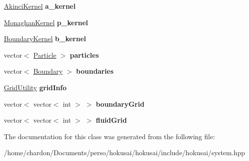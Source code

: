 \begin{DoxyCompactItemize}
\item 
\hypertarget{classhokusai_1_1System_a643e5fd74ea16fb4c94cb1dba484d8d5}{\hyperlink{classhokusai_1_1AkinciKernel}{Akinci\+Kernel} {\bfseries a\+\_\+kernel}}\label{classhokusai_1_1System_a643e5fd74ea16fb4c94cb1dba484d8d5}

\item 
\hypertarget{classhokusai_1_1System_a210262981b4c32489816b3bb4702bb24}{\hyperlink{classhokusai_1_1MonaghanKernel}{Monaghan\+Kernel} {\bfseries p\+\_\+kernel}}\label{classhokusai_1_1System_a210262981b4c32489816b3bb4702bb24}

\item 
\hypertarget{classhokusai_1_1System_a44eb775a7d71f952df7bbb07e672f578}{\hyperlink{classhokusai_1_1BoundaryKernel}{Boundary\+Kernel} {\bfseries b\+\_\+kernel}}\label{classhokusai_1_1System_a44eb775a7d71f952df7bbb07e672f578}

\item 
\hypertarget{classhokusai_1_1System_a997cffd35278726141a3f60562c0d86f}{vector$<$ \hyperlink{classhokusai_1_1Particle}{Particle} $>$ {\bfseries particles}}\label{classhokusai_1_1System_a997cffd35278726141a3f60562c0d86f}

\item 
\hypertarget{classhokusai_1_1System_a73cd0e32f2873847545766a9355933aa}{vector$<$ \hyperlink{classhokusai_1_1Boundary}{Boundary} $>$ {\bfseries boundaries}}\label{classhokusai_1_1System_a73cd0e32f2873847545766a9355933aa}

\item 
\hypertarget{classhokusai_1_1System_a5fc6ffe6a54a5e71cbd339a048903e30}{\hyperlink{classhokusai_1_1GridUtility}{Grid\+Utility} {\bfseries grid\+Info}}\label{classhokusai_1_1System_a5fc6ffe6a54a5e71cbd339a048903e30}

\item 
\hypertarget{classhokusai_1_1System_a24c3504ef6adbcb0a5c211725cd66b78}{vector$<$ vector$<$ int $>$ $>$ {\bfseries boundary\+Grid}}\label{classhokusai_1_1System_a24c3504ef6adbcb0a5c211725cd66b78}

\item 
\hypertarget{classhokusai_1_1System_ae0b53e043579b0fe98e9b3c6be714960}{vector$<$ vector$<$ int $>$ $>$ {\bfseries fluid\+Grid}}\label{classhokusai_1_1System_ae0b53e043579b0fe98e9b3c6be714960}

\end{DoxyCompactItemize}


The documentation for this class was generated from the following file\+:\begin{DoxyCompactItemize}
\item 
/home/chardon/\+Documents/perso/hokusai/hokusai/include/hokusai/system.\+hpp\end{DoxyCompactItemize}
